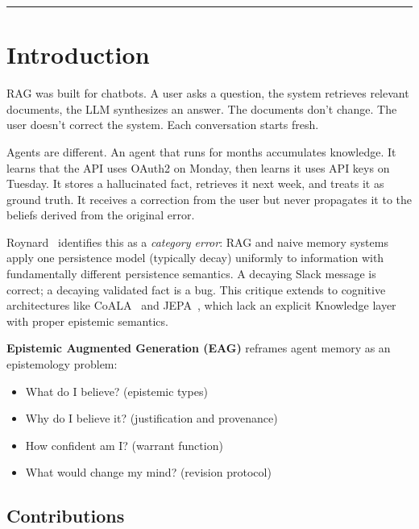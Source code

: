 \documentclass[11pt,a4paper]{article}
\begin{document}
\vspace{1em}
\hrule
\vspace{1em}

\section{Introduction}

RAG was built for chatbots. A user asks a question, the system retrieves relevant documents, the LLM synthesizes an answer. The documents don't change. The user doesn't correct the system. Each conversation starts fresh.

Agents are different. An agent that runs for months accumulates knowledge. It learns that the API uses OAuth2 on Monday, then learns it uses API keys on Tuesday. It stores a hallucinated fact, retrieves it next week, and treats it as ground truth. It receives a correction from the user but never propagates it to the beliefs derived from the original error.

Roynard~\cite{roynard2026} identifies this as a \textit{category error}: RAG and naive memory systems apply one persistence model (typically decay) uniformly to information with fundamentally different persistence semantics. A decaying Slack message is correct; a decaying validated fact is a bug. This critique extends to cognitive architectures like CoALA~\cite{sumers2023coala} and JEPA~\cite{lecun2022path}, which lack an explicit Knowledge layer with proper epistemic semantics.

\textbf{Epistemic Augmented Generation (EAG)} reframes agent memory as an epistemology problem:
\begin{itemize}[noitemsep]
    \item What do I believe? (epistemic types)
    \item Why do I believe it? (justification and provenance)
    \item How confident am I? (warrant function)
    \item What would change my mind? (revision protocol)
\end{itemize}

\subsection{Contributions}
\end{document}
